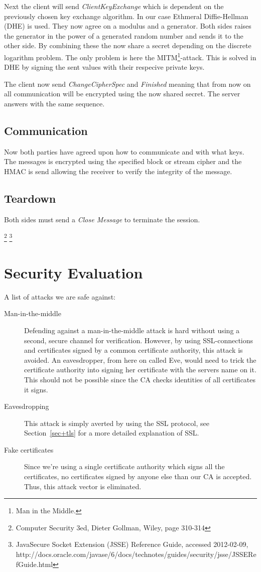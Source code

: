 \documentclass[10pt, a4paper]{article}
\begin{document}
Next the client will send \emph{ClientKeyExchange} which is dependent on the previously chosen key exchange algorithm. In our case Ethmeral Diffie-Hellman (DHE) is used. They now agree on a modulus and a generator. Both sides raises the generator in the power of a generated random number and sends it to the other side. By combining these the now share a secret depending on the discrete logarithm problem. The only problem is here the MITM\footnote{Man in the Middle.}-attack. This is solved in DHE by signing the sent values  with their respecive private keys.

The client now send \emph{ChangeCipherSpec} and \emph{Finished} meaning that from now on all communication will be encrypted using the now shared secret. The server answers with the same sequence.

\subsection{Communication}
Now both parties have agreed upon how to communicate and with what keys. The messages is encrypted using the specified block or stream cipher and the HMAC is send allowing the receiver to verify the integrity of the message.

\subsection{Teardown}
Both sides must send a \emph{Close Message} to terminate the session.


\footnote{Computer Security 3ed, Dieter Gollman, Wiley, page 310-314}
\footnote{Java\textregistered Secure Socket Extension (JSSE) Reference Guide, accessed 2012-02-09, http://docs.oracle.com/javase/6/docs/technotes/guides/security/jsse/JSSERefGuide.html}


\section{Security Evaluation}
A list of attacks we are safe against:
\begin{description}
\item[Man-in-the-middle] Defending against a man-in-the-middle attack is hard without using a second, secure channel for verification. However, by using SSL-connections and certificates signed by a common certificate authority, this attack is avoided. An eavesdropper, from here on called Eve, would need to trick the certificate authority into signing her certificate with the servers name on it. This should not be possible since the CA checks identities of all certificates it signs.
\item[Eavesdropping] This attack is simply averted by using the SSL protocol, see Section~\ref{sec+tls} for a more detailed explanation of SSL.
\item[Fake certificates] Since we're using a single certificate authority which signs all the certificates, no certificates signed by anyone else than our CA is accepted. Thus, this attack vector is eliminated.
\end{description}
\end{document}
